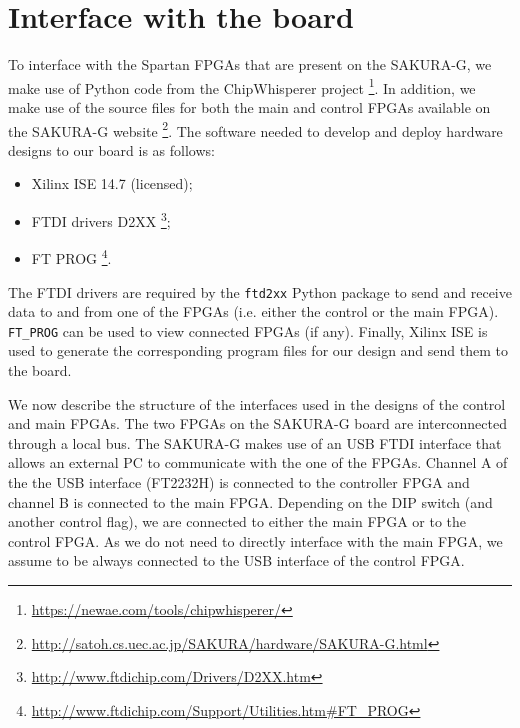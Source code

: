 \section{Interface with the board} \label{sec: Interface with the board}
To interface with the Spartan FPGAs that are present on the SAKURA-G, we make use of Python code from the ChipWhisperer project%
\footnote{\url{https://newae.com/tools/chipwhisperer/}}.
In addition, we make use of the source files for both the main and control FPGAs available on the SAKURA-G website%
\footnote{\url{http://satoh.cs.uec.ac.jp/SAKURA/hardware/SAKURA-G.html}}.
The software needed to develop and deploy hardware designs to our board is as follows:
%
\begin{itemize}
	\item Xilinx ISE 14.7 (licensed);
	\item FTDI drivers D2XX%
	\footnote{\url{http://www.ftdichip.com/Drivers/D2XX.htm}};
	\item FT PROG%
	\footnote{\url{http://www.ftdichip.com/Support/Utilities.htm\#FT_PROG}}.
\end{itemize}
%
The FTDI drivers are required by the \texttt{ftd2xx} Python package to send and receive data to and from one of the FPGAs (i.e. either the control or the main FPGA).
\texttt{FT_PROG} can be used to view connected FPGAs (if any).
Finally, Xilinx ISE is used to generate the corresponding program files for our design and send them to the board. 

We now describe the structure of the interfaces used in the designs of the control and main FPGAs.
The two FPGAs on the SAKURA-G board are interconnected through a local bus.
The SAKURA-G makes use of an USB FTDI interface that allows an external PC to communicate with the one of the FPGAs.
Channel A of the the USB interface (FT2232H) is connected to the controller FPGA and channel B is connected to the main FPGA.
Depending on the DIP switch (and another control flag), we are connected to either the main FPGA or to the control FPGA.
As we do not need to directly interface with the main FPGA, we assume to be always connected to the USB interface of the control FPGA.

